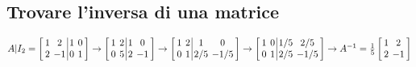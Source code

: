 \subsection{Trovare l'inversa di una matrice}
\(
A|I_2 = \left[
	\arraycolsep=2.0pt\def\arraystretch{1.0}
	\begin{array}{cc|cc}
		1 & 2 & 1 & 0 \\
		2 & -1 & 0 & 1 \\
	\end{array}
\right]
\rightarrow
\left[
	\arraycolsep=2.0pt\def\arraystretch{1.0}
	\begin{array}{cc|cc}
		1 & 2 & 1 & 0 \\
		0 & 5 & 2 & -1 \\
	\end{array}
\right]
\rightarrow
\left[
	\arraycolsep=2.0pt\def\arraystretch{1.0}
	\begin{array}{cc|cc}
		1 & 2 & 1 & 0 \\
		0 & 1 & 2/5 & -1/5 \\
	\end{array}
\right]
\rightarrow
\left[
	\arraycolsep=2.0pt\def\arraystretch{1.0}
	\begin{array}{cc|cc}
		1 & 0 & 1/5 & 2/5 \\
		0 & 1 & 2/5 & -1/5 \\
	\end{array}
\right]
\rightarrow
A^{-1} =
\frac{1}{5}
\left[
	\arraycolsep=2.0pt\def\arraystretch{1.0}
	\begin{array}{cc}
		1 & 2 \\
		2 & -1 \\
	\end{array}
\right]
\)
